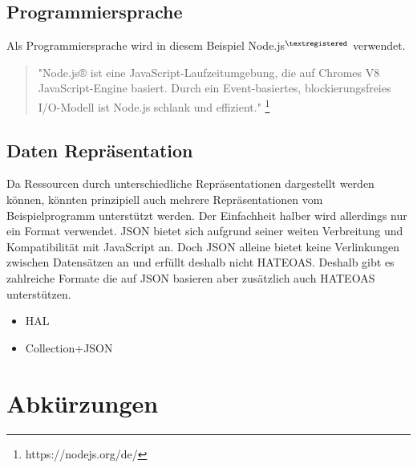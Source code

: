 \documentclass[listof=totoc]{article}
\begin{document}
	\subsection{Programmiersprache}
	Als Programmiersprache wird in diesem Beispiel Node.js$^{\tiny{\textregistered}}$ verwendet.
	\begin{quote}
		"Node.js® ist eine JavaScript-Laufzeitumgebung, die auf Chromes V8 JavaScript-Engine basiert. Durch ein Event-basiertes, blockierungsfreies I/O-Modell ist Node.js schlank und effizient."
		\footnote{https://nodejs.org/de/}
	\end{quote}
	\subsection{Daten Repräsentation}
	Da Ressourcen durch unterschiedliche Repräsentationen dargestellt werden können, könnten prinzipiell auch mehrere Repräsentationen vom Beispielprogramm unterstützt werden. Der Einfachheit halber wird allerdings nur ein Format verwendet.
	\ac{JSON} bietet sich aufgrund seiner weiten Verbreitung und Kompatibilität mit JavaScript an. Doch \ac{JSON} alleine bietet keine Verlinkungen zwischen Datensätzen an und erfüllt deshalb nicht \ac{HATEOAS}. Deshalb gibt es zahlreiche Formate die auf \ac{JSON} basieren aber zusätzlich auch \ac{HATEOAS} unterstützen. \cite{HATEOAS_FORMATS}
	\begin{itemize} 
		\setlength{\itemsep}{0pt} 
		\item HAL
		\item Collection+JSON
	\end{itemize}
	
	\newpage
	
	\setcounter{secnumdepth}{0}	%
	\section{Abkürzungen}
	\begin{acronym}[HTTP]
	\end{acronym}
	\newpage

	

	
	
\end{document}
